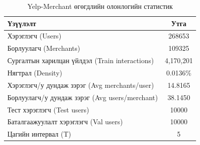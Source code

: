 \begin{table}[h]
\centering
\caption{Yelp-Merchant өгөгдлийн олонлогийн статистик}
\label{tab:dataset}
\begin{tabular}{lc}
\toprule
\textbf{Үзүүлэлт} & \textbf{Утга} \\
\midrule
Хэрэглэгч (Users) & 268653 \\
Борлуулагч (Merchants) & 109325 \\
Сургалтын харилцан үйлдэл (Train interactions) & 4,170,201 \\
Нягтрал (Density) & 0.0136\% \\
Хэрэглэгч/у дундаж зэрэг (Avg merchants/user) & 14.8165 \\
Борлуулагч/у дундаж зэрэг (Avg users/merchant) & 38.1450 \\
Тест хэрэглэгч (Test users) & 10000 \\
Баталгаажуулалт хэрэглэгч (Val users) & 10000 \\
Цагийн интервал (T) & 5 \\
\bottomrule
\end{tabular}
\end{table}